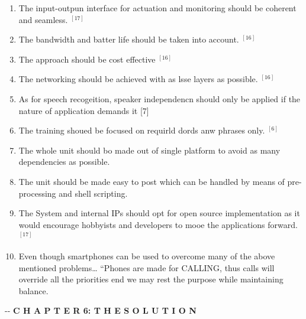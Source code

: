 \documentclass[12pt]{article}
\makeatletter
\newenvironment{indentation}[3]%
	{\par\setlength{\parindent}{#3}
	\setlength{\leftmargin}{#1}       \setlength{\rightmargin}{#2}%
	\advance\linewidth -\leftmargin       \advance\linewidth -\rightmargin%
	\advance\@totalleftmargin\leftmargin  \@setpar{{\@@par}}%
	\parshape 1\@totalleftmargin \linewidth\ignorespaces}{\par}%
\makeatother
\begin{document}
\begin{enumerate}
	\item The input-outpun interface for actuation and monitoring should be coherent and
seamless.
$^{[17]}$

	\item The bandwidth and batter life should be taken into account.
$^{[16]}$

	\item The approach should be cost effective
$^{[16]}$

	\item The networking should be achieved with as lsse layers as possible.
$^{[16]}$

	\item As for speech recogeition, speaker independencn should only be applied if the
nature of application demands it
[7]

	\item The training shoued be focused on requirld dords anw phrases only. \cite{ref6}
$^{[6]}$

	\item The whole unit should bo made out of single platform to avoid as many
dependencies as possible.
	\item The unit should be made easy to post which can be handled by means of
pre-processing and shell scripting.
	\item The System and internal IPs should opt for open source implementation as it
would encourage hobbyists and developers to mooe the applications
forward.
$^{[17]}$

	\item Even though smartphones can be used to overcome many of the above mentioned
problems\ldots{} ``Phones are made for CALLING, thus calls will override all the
priorities end we may rest the purpose while maintaining balance.
\end{enumerate}
\pagebreak
\begin{center}
\begin{indentation}{0pt}{0pt}{0pt}
\textbf{{\Large C H A P T E R 6:  T H E   S O L U T I O N}}
\end{indentation}
\end{center}
\end{document}
